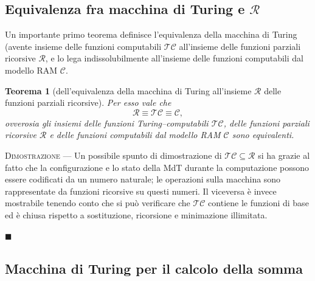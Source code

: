 \documentclass[10pt]{\classname}
\newtheorem{thm}{Teorema}
\theoremstyle{definition}
\theoremstyle{definition}
\begin{document}
\subsection{Equivalenza fra macchina di Turing e $\mathcal R$}

Un importante primo teorema definisce l'equivalenza della macchina di Turing (avente
insieme delle funzioni computabili $\mathcal{TC}$ all'insieme delle funzioni
parziali ricorsive $\mathcal R$, e lo lega indissolubilmente all'insieme delle
funzioni computabili dal modello RAM $\mathcal C$.


\begin{thm}[dell'equivalenza della macchina di Turing all'insieme $\mathcal R$ delle funzioni parziali ricorsive]

    Per esso vale che
    $$\mathcal R \equiv \mathcal {TC} \equiv \mathcal C,$$ ovverosia gli
    insiemi delle funzioni Turing--computabili $\mathcal{TC}$, delle funzioni
    parziali ricorsive $\mathcal R$ e delle funzioni computabili dal modello
    RAM $\mathcal C$ sono \emph{equivalenti}.
\end{thm}

\textsc{Dimostrazione} --- Un possibile spunto di dimostrazione di $\mathcal {TC} \subseteq \mathcal R$ si
ha grazie al fatto che la configurazione e lo stato della MdT durante la
computazione possono essere codificati da un numero naturale; le operazioni
sulla macchina sono rappresentate da funzioni ricorsive su questi numeri. Il
viceversa è invece mostrabile tenendo conto che si può verificare che
$\mathcal{TC}$ contiene le funzioni di base ed è chiusa rispetto a sostituzione,
ricorsione e minimazione illimitata.

\begin{flushright}
$\blacksquare$
\end{flushright}



\subsection{Macchina di Turing per il calcolo della somma}
\end{document}
